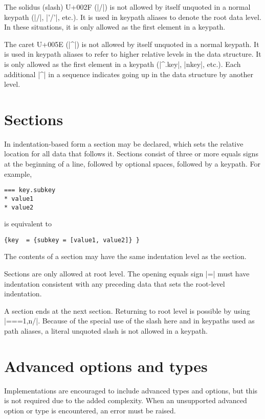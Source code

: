 \documentclass[11pt]{article}
\begin{document}
{{The solidus (slash) U+002F (|/|) is not allowed by itself unquoted in a normal keypath (|{/}|, |{'/'}|, etc.).  It is used in keypath aliases to denote the root data level.  In these situations, it is only allowed as the first element in a keypath.

The caret U+005E (|^|) is not allowed by itself unquoted in a normal keypath.  It is used in keypath aliases to refer to higher relative levels in the data structure.  It is only allowed as the first element in a keypath (|^.key|, |^^.key|, etc.).  Each additional |^| in a sequence indicates going up in the data structure by another level.

\section{Sections}

In indentation-based form a section may be declared, which sets the relative location for all data that follows it.  Sections consist of three or more equals signs at the beginning of a line, followed by optional spaces, followed by a keypath.  For example,
\begin{Verbatim}
=== key.subkey
* value1
* value2
\end{Verbatim}
is equivalent to
\begin{Verbatim}
{key  = {subkey = [value1, value2]} }
\end{Verbatim}
The contents of a section may have the same indentation level as the section.

Sections are only allowed at root level.  The opening equals sign |=| must have indentation consistent with any preceding data that sets the root-level indentation.

A section ends at the next section.  Returning to root level is possible by using |==={1,n}/|.  Because of the special use of the slash here and in keypaths used as path aliases, a literal unquoted slash is not allowed in a keypath.



\section{Advanced options and types}
\label{sec:advanced-options-and-types}

Implementations are encouraged to include advanced types and options, but this is not required due to the added complexity.  When an unsupported advanced option or type is encountered, an error must be raised.

}}
\end{document}
